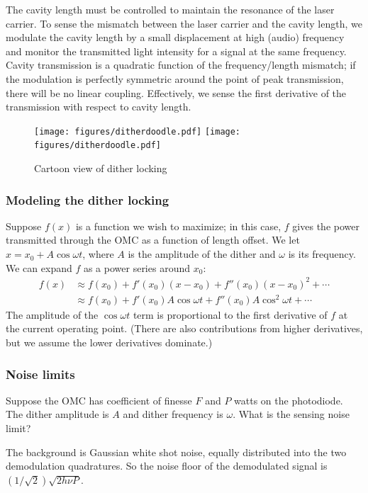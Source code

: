 The cavity length must be controlled to maintain the resonance of the
laser carrier.  To sense the mismatch between the laser carrier and
the cavity length, we modulate the cavity length by a small
displacement at high (audio) frequency and monitor the transmitted light
intensity for a signal at the same frequency.  Cavity transmission is
a quadratic function of the frequency/length mismatch; if the
modulation is perfectly symmetric around the point of peak
transmission, there will be no linear coupling.  Effectively, we sense
the first derivative of the transmission with respect to cavity
length.  

\begin{figure}[t]
\centerline{\texttt{[image: figures/ditherdoodle.pdf]}
\hfill
\texttt{[image: figures/ditherdoodle.pdf]}}
\caption[Cartoon view of dither locking]{\label{fig:dither-doodle}Cartoon view of dither locking}
\end{figure}

\subsubsection{Modeling the dither locking}

Suppose $f(x)$ is a function we wish to maximize; in this case, $f$
gives the power transmitted through the OMC as a function of length
offset.  We let $x = x_0 + A \cos\omega t$, where $A$ is the amplitude
of the dither and $\omega$ is its frequency.  We can expand $f$ as a
power series around $x_0$: 
\begin{align}
f(x) &\approx f(x_0) + f'(x_0)\left(x - x_0\right) + f''(x_0)\left(x-x_0\right)^2 + \cdots \\
     &\approx f(x_0) + f'(x_0)A\cos\omega t        + f''(x_0)A\cos^2\omega t + \cdots
\end{align}
%
The amplitude of the $\cos\omega t$ term is proportional to the first
derivative of $f$ at the current operating point.  (There are also
contributions from higher derivatives, but we assume the lower
derivatives dominate.)

\subsubsection{Noise limits}

Suppose the OMC has coefficient of finesse $F$ and $P$ watts on the
photodiode.  The dither amplitude is $A$ and dither frequency is
$\omega$.  What is the sensing noise limit?

The background is Gaussian white shot noise, equally distributed into
the two demodulation quadratures.  So the noise floor of the
demodulated signal is $(1/\sqrt{2})\sqrt{2 h \nu P}$.

